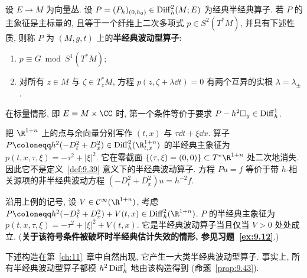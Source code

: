 \begin{definition}[半经典波动型算子]\label{def:9.39}
设 $E \to M$ 为向量丛. 设 $P = (P_h)_{(0, h_0)} \in \operatorname{Diff}_h^2(M; E)$ 为经典半经典算子. 若 $P$ 的主象征是主标量的, 且等于一个纤维上二次多项式 $p \in S^2(T^* M)$, 并具有下述性质, 则称 $P$ 为 $(M, g, t)$ 上的\textbf{半经典波动型算子}:
\begin{enumerate}
    \item $p \equiv G \bmod S^1(T^* M)$;
    \item 对所有 $z \in M$ 与 $\zeta \in T_z^* M$, 方程 $p(z, \zeta + \lambda \dd t) = 0$ 有两个互异的实根 $\lambda = \lambda_\pm$.
\end{enumerate}
\end{definition}

在标量情形, 即 $E = M \times \CC$ 时, 第一个条件等价于要求 $P - h^2 \Box_g \in \operatorname{Diff}_h^1$.

\begin{example}[一个非例]\label{eg:9.40}
把 $\R^{1+n}$ 上的点与余向量分别写作 $(t, x)$ 与 $\tau \dd t + \xi \dd x$. 算子 $P \defeq h^2(-D_t^2 + D_x^2) \in \Diff_h^2(\R_{t,x}^{1+n})$ 的半经典主象征为 $p(t, x, \tau, \xi) = -\tau^2 + |\xi|^2$. 它在零截面 $\{(\tau, \xi) = (0,0)\} \subset T^* \R^{1+n}$ 处二次地消失. 因此它不是定义~\ref{def:9.39} 意义下的半经典波动算子. 方程 $P u = f$ 等价于带 $h$-相关源项的非半经典波动方程 $(-D_t^2 + D_x^2)u = h^{-2} f$.
\end{example}

\begin{example}[带位势的波动算子]\label{eg:9.41}
沿用上例的记号, 设 $V \in \Smooth(\R^{1+n})$, 考虑 $P \defeq h^2(-D_t^2 + D_x^2) + V(t, x) \in \Diff_h^2(\R^{1+n})$. $P$ 的半经典主象征为 $p(t, x, \tau, \xi) = -\tau^2 + |\xi|^2 + V(t, x)$. 它是半经典波动算子当且仅当 $V > 0$ 处处成立. (\textbf{关于该符号条件被破坏时半经典估计失效的情形, 参见习题~\ref{ex:9.12}}.)
\end{example}

下述构造在第~\ref{ch:11}~章中自然出现, 它产生一大类半经典波动型算子. 事实上, 所有半经典波动型算子都模 $h^2 \operatorname{Diff}_h^1$ 地由该构造得到 (命题~\ref{prop:9.43}).

